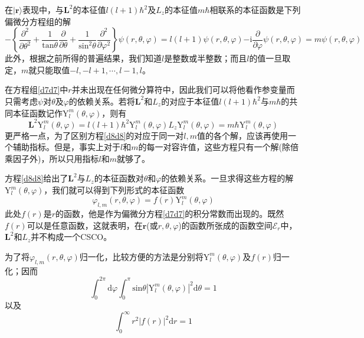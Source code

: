 \documentclass[]{article}
\begin{document}
在${|\boldsymbol{r}\rangle}$表现中，与$\boldsymbol{L}^2$的本征值$l(l+1)\hbar^2$及$L_z$的本征值$m\hbar$相联系的本征函数是下列偏微分方程组的解
\begin{subequations}
	\begin{equation}
		-\left\lbrace \dfrac{\partial^2}{\partial\theta^2}+\dfrac{1}{\mathrm{tan}\theta}\dfrac{\partial}{\partial\theta}+\dfrac{1}{\mathrm{sin}^2\theta}\dfrac{\partial^2}{\partial\varphi^2}\right\rbrace \psi(r,\theta,\varphi)=l(l+1)\psi(r,\theta,\varphi)
	\end{equation}
	\begin{equation}
		-\mathrm{i}\dfrac{\partial}{\partial\varphi}\psi(r,\theta,\varphi)=m\psi(r,\theta,\varphi)
		\label{d7bd7b}
	\end{equation}
\label{d7d7}
\end{subequations}
此外，根据之前所得的普遍结果，我们知道$l$是整数或半整数；而且$l$的值一旦取定，$m$就只能取值$-l,-l+1,\cdots,l-1,l$。\par
在方程组\eqref{d7d7}中$r$并未出现在任何微分算符中，因此我们可以将他看作参变量而只需考虑$\psi$对$\theta$及$\varphi$的依赖关系。若将$\boldsymbol{L}^2$和$L_z$的对应于本征值$l(l+1)\hbar^2$与$m\hbar$的共同本征函数记作$\mathrm{Y}_l^m(\theta,\varphi)$，则有
\begin{subequations}
	\begin{equation}
		\boldsymbol{L}^2\mathrm{Y}_l^m(\theta,\varphi)=l(l+1)\hbar^2\mathrm{Y}_l^m(\theta,\varphi)
	\end{equation}
	\begin{equation}
		L_z\mathrm{Y}_l^m(\theta,\varphi)=m\hbar \mathrm{Y}_l^m(\theta,\varphi)
		\label{d8bd8b}
	\end{equation}
\label{d8d8}
\end{subequations} 
更严格一点，为了区别方程\eqref{d8d8}的对应于同一对$l,m$值的各个解，应该再使用一个辅助指标。但是，事实上对于$l$和$m$的每一对容许值，这些方程只有一个解(除倍乘因子外)，所以只用指标$l$和$m$就够了。\par 
方程\eqref{d8d8}给出了$\boldsymbol{L}^2$与$L_z$的本征函数对$\theta$和$\varphi$的依赖关系。一旦求得这些方程的解$\mathrm{Y}_l^m(\theta,\varphi)$，我们就可以得到下列形式的本征函数
\begin{equation}
	\varphi_{l,m}(r,\theta,\varphi)=f(r)\mathrm{Y}_l^m(\theta,\varphi)
\end{equation}
此处$f(r)$是$r$的函数，他是作为偏微分方程\eqref{d7d7}的积分常数而出现的。既然$f(r)$可以是任意函数，这就表明，在$\boldsymbol{r}$(或$r,\theta,\varphi$)的函数所张成的函数空间$\mathscr{E}_r$中，$\boldsymbol{L}^2$和$L_z$并不构成一个CSCO。\par 
为了将$\varphi_{l,m}(r,\theta,\varphi)$归一化，比较方便的方法是分别将$\mathrm{Y}_l^m(\theta,\varphi)$及$f(r)$归一化；因而
\begin{equation}
	\int_{0}^{2\pi}\mathrm{d}\varphi\int_{0}^{\pi}\mathrm{sin}\theta|\mathrm{Y}_l^m(\theta,\varphi)|^2\mathrm{d}\theta=1
\end{equation}
以及
\begin{equation}
	\int_{0}^{\infty}r^2|f(r)|^2\mathrm{d}r=1
\end{equation}
\end{document}
